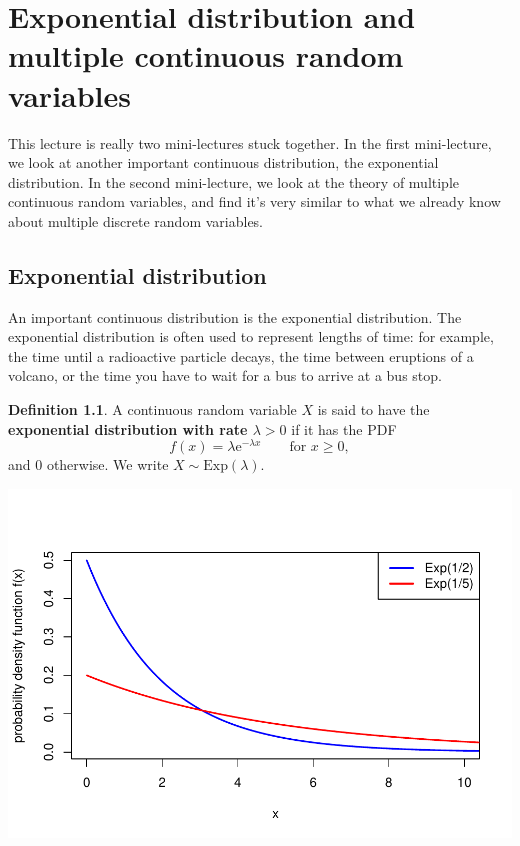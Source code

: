 \documentclass[
  a4paper,
]{book}
\theoremstyle{definition}
\newtheorem{definition}{Definition}[chapter]
\theoremstyle{definition}
\theoremstyle{definition}
\theoremstyle{definition}
\theoremstyle{remark}
\begin{document}
\hypertarget{L17-exp-multiple}{%
\chapter{Exponential distribution and multiple continuous random variables}\label{L17-exp-multiple}}

This lecture is really two mini-lectures stuck together. In the first mini-lecture, we look at another important continuous distribution, the exponential distribution. In the second mini-lecture, we look at the theory of multiple continuous random variables, and find it's very similar to what we already know about multiple discrete random variables.

\hypertarget{exponential}{%
\section{Exponential distribution}\label{exponential}}

An important continuous distribution is the exponential distribution. The exponential distribution is often used to represent lengths of time: for example, the time until a radioactive particle decays, the time between eruptions of a volcano, or the time you have to wait for a bus to arrive at a bus stop.

\begin{definition}
A continuous random variable \(X\) is said to have the \textbf{exponential distribution with rate \(\lambda > 0\)} if it has the PDF
\[ f(x) = \lambda \mathrm{e}^{-\lambda x} \qquad \text{for $x \geq 0$}, \]
and 0 otherwise. We write \(X \sim \text{Exp}(\lambda)\).
\end{definition}

\includegraphics{math1710_files/figure-latex/exp-pic-1.pdf}
\end{document}
